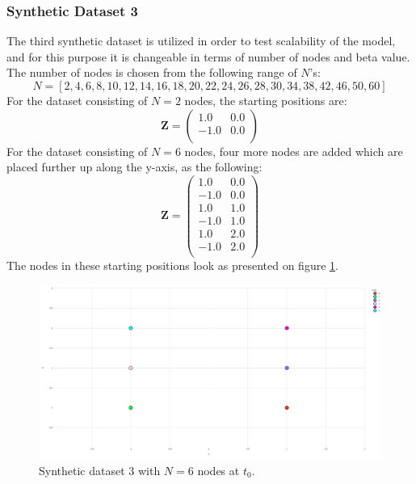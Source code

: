 \subsubsection{Synthetic Dataset 3}
\label{sec:Data:SyntheticData:SyntheticDataset3}
The third synthetic dataset is utilized in order to test scalability of the model, and for this purpose it is changeable in terms of number of nodes and beta value.
The number of nodes is chosen from the following range of $N$'s:
\begin{equation}
    N = [2, 4, 6, 8, 10, 12, 14, 16, 18, 20, 22, 24, 26, 28, 30, 34, 38, 42, 46, 50, 60]
\end{equation}
For the dataset consisting of $N = 2$ nodes, the starting positions are:
\begin{equation}
        \textbf{Z} = \left( \begin{matrix}
                1.0 & 0.0\\
                -1.0 & 0.0\\
                \end{matrix}\right)
\end{equation}
For the dataset consisting of $N = 6$ nodes, four more nodes are added which are placed further up along the y-axis, as the following:
\begin{equation}
        \textbf{Z} = \left( \begin{matrix}
                1.0 & 0.0\\
                -1.0 & 0.0\\
                1.0 & 1.0\\
                -1.0 & 1.0\\
                1.0 & 2.0\\
                -1.0 & 2.0\\
                \end{matrix}\right)
\end{equation}
The nodes in these starting positions look as presented on figure \ref{fig:synth3}.
\begin{figure}[H]
    \centering
    \includegraphics[width=\textwidth]{0_images/synth3_n6.png}
    \caption{Synthetic dataset 3 with $N=6$ nodes at $t_0$.}
    \label{fig:synth3}
\end{figure}

